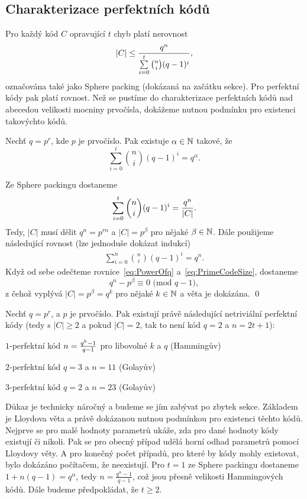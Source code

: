 \subsection{Charakterizace perfektních kódů}
Pro každý kód $C$ opravující $t$ chyb platí nerovnost
\[
|C| \leq { q^n \over \sum\limits_{i=0}^t \binom{n}{i} (q-1)^i },
\]
označována také jako Sphere packing (dokázaná na začátku sekce). Pro perfektní kódy pak platí rovnost. Než se pustíme do charakterizace perfektních kódů nad abecedou velikosti mocniny prvočísla, dokážeme nutnou podmínku pro existenci takovýchto kódů.

\vt Nechť $q=p^r$, kde $p$ je prvočíslo. Pak existuje $\alpha \in \mathbb{N}$ takové, že
\[
\sum\limits_{i=0}^t \binom{n}{i} (q-1)^i = q^\alpha.
\]

\dk Ze Sphere packingu dostaneme
\begin{align}
\sum\limits_{i=0}^t \binom{n}{i} (q-1)^i = { q^n \over |C| }. \label{eq:PrimeCodeSize}
\end{align}
Tedy, $|C|$ musí dělit $q^n = p^{rn}$ a $|C| = p^\beta$ pro nějaké $\beta \in \mathbb{N}$. Dále použijeme následující rovnost (lze jednoduše dokázat indukcí)
\begin{align}
\sum\limits_{i=0}^n \binom{n}{i} (q-1)^i = q^n. \label{eq:PowerOfq}
\end{align}
Když od sebe odečteme rovnice~\ref{eq:PowerOfq} a~\ref{eq:PrimeCodeSize}, dostaneme
\[
q^n - p^\beta \equiv 0 \text{ (mod } q - 1),
\]
z čehož vyplývá $|C| = p^\beta = q^k$ pro nějaké $k \in \mathbb{N}$ a věta je dokázána. \qed


\vt Nechť $q=p^r$, a $p$ je prvočíslo. Pak existují právě následující netriviální perfektní kódy (tedy s $|C| \geq 2$ a pokud $|C| = 2$, tak to není kód $q=2$ a $n=2t+1$):
\begin{description}
	\item $1$-perfektní kód $n={q^k-1 \over q-1}$ pro libovolné $k$ a $q$ (Hammingův)
	\item $2$-perfektní kód $q=3$ a $n=11$ (Golayův)
	\item $3$-perfektní kód $q=2$ a $n=23$ (Golayův)
\end{description}


Důkaz je technicky náročný a budeme se jím zabývat po zbytek sekce. Základem je Lloydova věta a právě dokázanou nutnou podmínkou pro existenci těchto kódů. Nejprve se pro malé hodnoty parametrů ukáže, zda pro dané hodnoty kódy existují či nikoli. Pak se pro obecný případ udělá horní odhad parametrů pomocí Lloydovy věty. A pro konečný počet případů, pro které by kódy mohly existovat, bylo dokázáno počítačem, že neexistují.  Pro $t = 1$ ze Sphere packingu dostaneme $1 + n(q - 1) = q^\alpha$, tedy $n = \frac{q^\alpha - 1}{q - 1}$, což jsou přesně velikosti Hammingových kódů. Dále budeme předpokládat, že $t \geq 2$.

